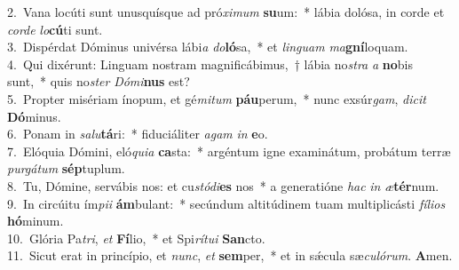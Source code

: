 {2.~}Vana locúti sunt unusquísque ad pró\textit{xi}\textit{mum} \textbf{su}um:~* lábia dolósa, in corde et \textit{cor}\textit{de} \textit{lo}\textbf{cú}ti sunt.\\
{3.~}Dispérdat Dóminus univérsa lábi\textit{a} \textit{do}\textbf{ló}sa,~* et \textit{lin}\textit{guam} \textit{ma}\textbf{gní}loquam.\\
{4.~}Qui dixérunt: Linguam nostram magnificábimus,~† lábia no\textit{stra} \textit{a} \textbf{no}bis sunt,~* quis no\textit{ster} \textit{Dó}\textit{mi}\textbf{nus} est?\\
{5.~}Propter misériam ínopum, et gé\textit{mi}\textit{tum} \textbf{páu}perum,~* nunc exsúr\textit{gam}, \textit{di}\textit{cit} \textbf{Dó}minus.\\
{6.~}Ponam in \textit{sa}\textit{lu}\textbf{tá}ri:~* fiduciáliter \textit{a}\textit{gam} \textit{in} \textbf{e}o.\\
{7.~}Elóquia Dómini, eló\textit{qui}\textit{a} \textbf{ca}sta:~* argéntum igne examinátum, probátum terræ \textit{pur}\textit{gá}\textit{tum} \textbf{sép}tuplum.\\
{8.~}Tu, Dómine, servábis nos: et cu\textit{stó}\textit{di}\textbf{es} nos~* a generatióne \textit{hac} \textit{in} \textit{æ}\textbf{tér}num.\\
{9.~}In circúitu ím\textit{pi}\textit{i} \textbf{ám}bulant:~* secúndum altitúdinem tuam multiplicásti \textit{fí}\textit{li}\textit{os} \textbf{hó}minum.\\
{10.~}Glória Pa\textit{tri}, \textit{et} \textbf{Fí}lio,~* et Spi\textit{rí}\textit{tu}\textit{i} \textbf{San}cto.\\
{11.~}Sicut erat in princípio, et \textit{nunc}, \textit{et} \textbf{sem}per,~* et in sǽcula sæ\textit{cu}\textit{ló}\textit{rum}. \textbf{A}men.\\
